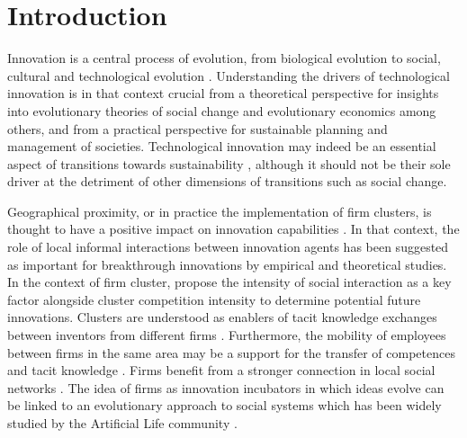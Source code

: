 \documentclass[letterpaper]{article}
\begin{document}


\section{Introduction}

Innovation is a central process of evolution, from biological evolution to social, cultural \citep{mesoudi2018cumulative} and technological evolution \citep{sood2005technological}. Understanding the drivers of technological innovation is in that context crucial from a theoretical perspective for insights into evolutionary theories of social change and evolutionary economics among others, and from a practical perspective for sustainable planning and management of societies. Technological innovation may indeed be an essential aspect of transitions towards sustainability \citep{adams2016sustainability}, although it should not be their sole driver at the detriment of other dimensions of transitions such as social change.

Geographical proximity, or in practice the implementation of firm clusters, is thought to have a positive impact on innovation capabilities \citep{bittencourt2019cluster}. In that context, the role of local informal interactions between innovation agents has been suggested as important for breakthrough innovations by empirical and theoretical studies. In the context of firm cluster, \cite{gnyawali2013complementary} propose the intensity of social interaction as a key factor alongside cluster competition intensity to determine potential future innovations. Clusters are understood as enablers of tacit knowledge exchanges between inventors from different firms \citep{arikan2009interfirm}. Furthermore, the mobility of employees between firms in the same area may be a support for the transfer of competences and tacit knowledge \citep{almeida1999localization}. Firms benefit from a stronger connection in local social networks \citep{kemeny2016economic}. The idea of firms as innovation incubators in which ideas evolve can be linked to an evolutionary approach to social systems which has been widely studied by the Artificial Life community \citep{marriott2018social}.
\end{document}
